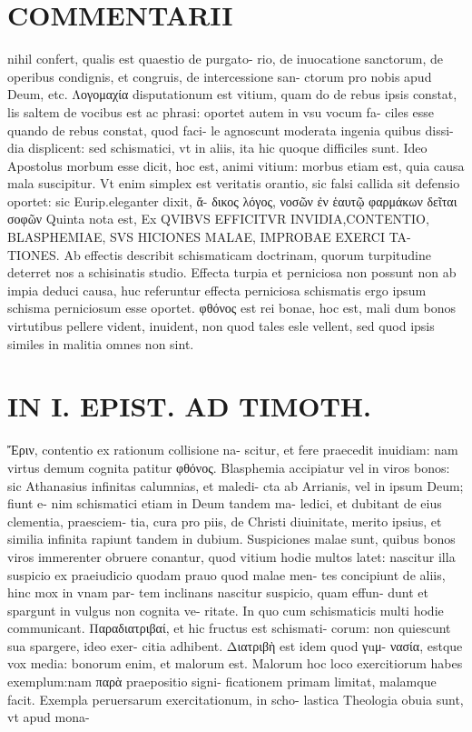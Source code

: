 \documentclass{article}
\begin{document}
\begin{pages}
\section*{COMMENTARII }
\marginpar{[ p.152 ]}\pstart nihil confert, qualis est quaestio de purgato- rio, de inuocatione sanctorum, de operibus condignis, et congruis, de intercessione san- ctorum pro nobis apud Deum, etc.  \pend\pstart Λογομαχία disputationum est vitium, quam do de rebus ipsis constat, lis saltem de vocibus est ac phrasi: oportet autem in vsu vocum fa- ciles esse quando de rebus constat, quod faci- le agnoscunt moderata ingenia quibus dissi- dia displicent: sed schismatici, vt in aliis, ita hic quoque difficiles sunt. Ideo Apostolus morbum esse dicit, hoc est, animi vitium: morbus etiam est, quia causa mala suscipitur. Vt enim simplex est veritatis orantio, sic falsi callida sit defensio oportet: sic Eurip.eleganter dixit, ἄ- δικος λόγος, νοσῶν ἐν ἑαυτῷ φαρμάκων δεῖται σοφῶν  \pend\pstart Quinta nota est, Ex QVIBVS EFFICITVR INVIDIA,CONTENTIO, BLASPHEMIAE, SVS HICIONES MALAE, IMPROBAE EXERCI TA- TIONES. Ab effectis describit schismaticam doctrinam, quorum turpitudine deterret nos a schisinatis studio. Effecta turpia et perniciosa non possunt non ab impia deduci causa, huc referuntur effecta perniciosa schismatis ergo ipsum schisma perniciosum esse oportet. φθόνος est rei bonae, hoc est, mali dum bonos virtutibus pellere vident, inuident, non quod tales esle vellent, sed quod ipsis similes in malitia omnes non sint.  \pend
\section*{IN I. EPIST. AD TIMOTH. }
\marginpar{[ p.153 ]}\pstart Ἔριν, contentio ex rationum collisione na- scitur, et fere praecedit inuidiam: nam virtus demum cognita patitur φθόνος.  \pend\pstart Blasphemia accipiatur vel in viros bonos: sic Athanasius infinitas calumnias, et maledi- cta ab Arrianis, vel in ipsum Deum; fiunt e- nim schismatici etiam in Deum tandem ma- ledici, et dubitant de eius clementia, praesciem- tia, cura pro piis, de Christi diuinitate, merito ipsius, et similia infinita rapiunt tandem in dubium.  \pend\pstart Suspiciones malae sunt, quibus bonos viros immerenter obruere conantur, quod vitium hodie multos latet: nascitur illa suspicio ex praeiudicio quodam prauo quod malae men- tes concipiunt de aliis, hinc mox in vnam par- tem inclinans nascitur suspicio, quam effun- dunt et spargunt in vulgus non cognita ve- ritate. In quo cum schismaticis multi hodie communicant.  \pend\pstart Παραδιατριβαί, et hic fructus est schismati- corum: non quiescunt sua spargere, ideo exer- citia adhibent. Διατριβὴ est idem quod γuμ- νασία, estque vox media: bonorum enim, et malorum est. Malorum hoc loco exercitiorum habes exemplum:nam παρὰ praepositio signi- ficationem primam limitat, malamque facit. Exempla peruersarum exercitationum, in scho- lastica Theologia obuia sunt, vt apud mona-  \pend

\end{pages}
\end{document}
